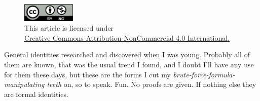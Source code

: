 \documentclass[twoside]{article}
\begin{document}
\begin{figure}[h]
\centering
\includegraphics[width=1in]{cc-by-nc.png}\\[0.1in]
\tiny This article is licensed under \\
\href{http://creativecommons.org/licenses/by-nc/4.0/}
{Creative Commons Attribution-NonCommercial 4.0 International.}\\[0.3in]
\end{figure}

General identities researched and discovered when I was young. Probably all of them are known,
that was the usual trend I found, and I doubt I'll have any use for them these days,
but these are the forms I cut my \emph{brute-force-formula-manipulating teeth} on, so to speak.
Fun.  No proofs are given. If nothing else they are formal identities.
\end{document}

